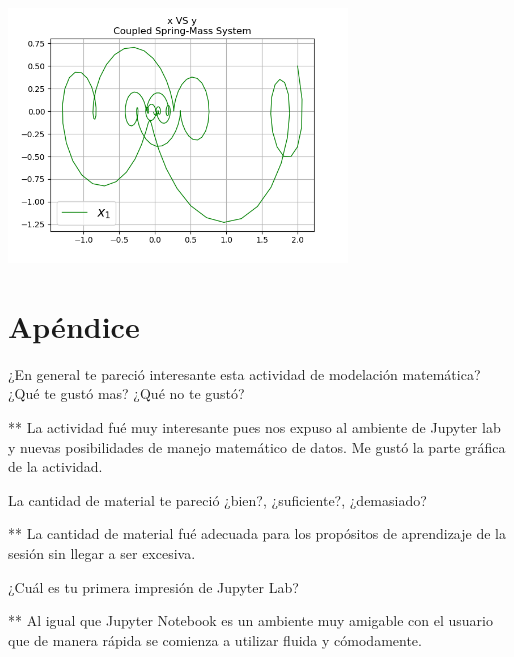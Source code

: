 \documentclass{article} %
\begin{document}
\begin{center}
 	\includegraphics[width=9cm]{two_springs4-4.png}
 \end{center}

\vspace{12 cm}

\section*{Apéndice}

\hspace{0.45 cm} ¿En general te pareció interesante esta actividad de modelación matemática? ¿Qué te gustó mas? ¿Qué no te gustó?

\vspace{0.5 cm}

** La actividad fué muy interesante pues nos expuso al ambiente de Jupyter lab y nuevas posibilidades de manejo matemático de datos. Me gustó la parte gráfica de la actividad.

\vspace{0.5 cm}

La cantidad de material te pareció ¿bien?, ¿suficiente?, ¿demasiado?

\vspace{0.5 cm}

** La cantidad de material fué adecuada para los propósitos de aprendizaje de la sesión sin llegar a ser excesiva. 

\vspace{0.5 cm}

¿Cuál es tu primera impresión de Jupyter Lab? 

\vspace{0.5 cm}

** Al igual que Jupyter Notebook es un ambiente muy amigable con el usuario que de manera rápida se comienza a utilizar fluida y cómodamente. 
\end{document}

